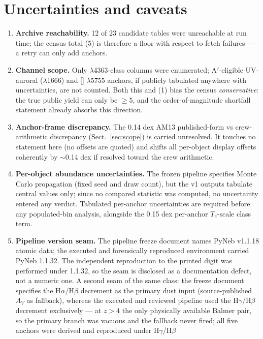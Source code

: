 \documentclass[twocolumn]{aastex702}
\newcommand{\te}{$T_e$}
\begin{document}
\section{Uncertainties and caveats}\label{sec:uncertainties}

\begin{enumerate}
\item \textbf{Archive reachability.} 12 of 23 candidate tables were unreachable
at run time; the census total (5) is therefore a floor with respect to fetch
failures --- a retry can only add anchors.
\item \textbf{Channel scope.} Only $\lambda$4363-class columns were enumerated;
A$'$-eligible UV-auroral ($\lambda$1666) and [] $\lambda$5755 anchors,
if publicly tabulated anywhere with uncertainties, are not counted. Both this
and (1) bias the census \emph{conservative}: the true public yield can only be
$\geq5$, and the order-of-magnitude shortfall statement already absorbs this
direction.
\item \textbf{Anchor-frame discrepancy.} The 0.14 dex AM13 published-form vs
crew-arithmetic discrepancy (Sect.~\ref{sec:scope}) is carried unresolved. It
touches no statement here (no offsets are quoted) and shifts all per-object
display offsets coherently by $\sim$0.14 dex if resolved toward the crew
arithmetic.
\item \textbf{Per-object abundance uncertainties.} The frozen pipeline specifies
Monte Carlo propagation (fixed seed and draw count), but the v1 outputs tabulate
central values only; since no compared statistic was computed, no uncertainty
entered any verdict. Tabulated per-anchor uncertainties are required before any
populated-bin analysis, alongside the 0.15 dex per-anchor \te{}-scale class term.
\item \textbf{Pipeline version seam.} The pipeline freeze document names PyNeb
v1.1.18 atomic data; the executed and forensically reproduced environment carried
PyNeb 1.1.32. The independent reproduction to the printed digit was performed
under 1.1.32, so the seam is disclosed as a documentation defect, not a numeric
one. A second seam of the same class: the freeze document specifies the
H$\alpha$/H$\beta$ decrement as the primary dust input (source-published $A_V$
as fallback), whereas the executed and reviewed pipeline used the
H$\gamma$/H$\beta$ decrement exclusively --- at $z>4$ the only physically
available Balmer pair, so the primary branch was vacuous and the fallback never
fired; all five anchors were derived and reproduced under H$\gamma$/H$\beta$

\end{enumerate}
\end{document}
